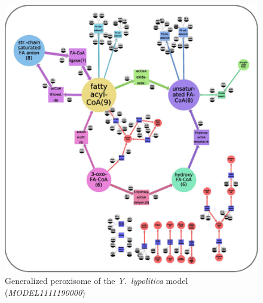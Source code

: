 \documentclass[9pt]{article}
\newcounter{fig}
\newcounter{rm}
\begin{document}
\begin{figure}[th]
\captionsetup{labelformat=empty}
\centering
\includegraphics{../pics/Zhukova_Fig_3.eps}
\caption{Generalized peroxisome of the \textit{Y.~lypolitica} model (\emph{MODEL1111190000})}  
\end{figure}
\clearpage
\end{document}

